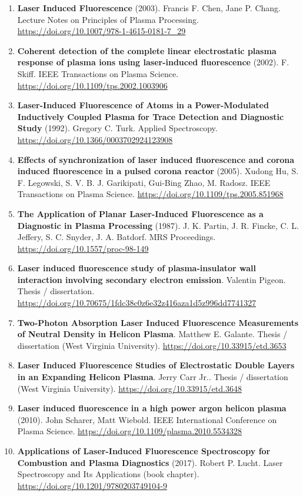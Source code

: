 \documentclass[11pt,a4paper]{article}
\begin{document}
\begin{enumerate}[leftmargin=1.4em]
\item \textbf{Laser Induced Fluorescence} (2003). Francis F. Chen, Jane P. Chang. Lecture Notes on Principles of Plasma Processing. \url{https://doi.org/10.1007/978-1-4615-0181-7_29}
\item \textbf{Coherent detection of the complete linear electrostatic plasma response of plasma ions using laser-induced fluorescence} (2002). F. Skiff. IEEE Transactions on Plasma Science. \url{https://doi.org/10.1109/tps.2002.1003906}
\item \textbf{Laser-Induced Fluorescence of Atoms in a Power-Modulated Inductively Coupled Plasma for Trace Detection and Diagnostic Study} (1992). Gregory C. Turk. Applied Spectroscopy. \url{https://doi.org/10.1366/0003702924123908}
\item \textbf{Effects of synchronization of laser induced fluorescence and corona induced fluorescence in a pulsed corona reactor} (2005). Xudong Hu, S. F. Legowski, S. V. B. J. Garikipati, Gui-Bing Zhao, M. Radosz. IEEE Transactions on Plasma Science. \url{https://doi.org/10.1109/tps.2005.851968}
\item \textbf{The Application of Planar Laser-Induced Fluorescence as a Diagnostic in Plasma Processing} (1987). J. K. Partin, J. R. Fincke, C. L. Jeffery, S. C. Snyder, J. A. Batdorf. MRS Proceedings. \url{https://doi.org/10.1557/proc-98-149}
\item \textbf{Laser induced fluorescence study of plasma-insulator wall interaction involving secondary electron emission}. Valentin Pigeon. Thesis / dissertation. \url{https://doi.org/10.70675/1fdc38c0z6e32z416aza1d5z996dd7741327}
\item \textbf{Two-Photon Absorption Laser Induced Fluorescence Measurements of Neutral Density in Helicon Plasma}. Matthew E. Galante. Thesis / dissertation (West Virginia University). \url{https://doi.org/10.33915/etd.3653}
\item \textbf{Laser Induced Fluorescence Studies of Electrostatic Double Layers in an Expanding Helicon Plasma}. Jerry Carr Jr.. Thesis / dissertation (West Virginia University). \url{https://doi.org/10.33915/etd.3648}
\item \textbf{Laser induced fluorescence in a high power argon helicon plasma} (2010). John Scharer, Matt Wiebold. IEEE International Conference on Plasma Science. \url{https://doi.org/10.1109/plasma.2010.5534328}
\item \textbf{Applications of Laser-Induced Fluorescence Spectroscopy for Combustion and Plasma Diagnostics} (2017). Robert P. Lucht. Laser Spectroscopy and Its Applications (book chapter). \url{https://doi.org/10.1201/9780203749104-9}

\end{enumerate}
\end{document}
